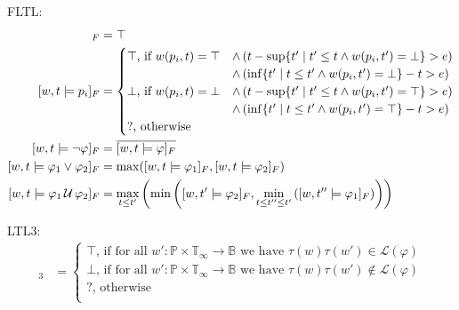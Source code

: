 \documentclass[envcountsame, runningheads]{llncs}
\newcommand{\B}{\mathbb{B}}
\def\until{\,\mathcal{U}\,}
\def\since{\,\mathcal{S}\,}
\newcommand{\?}{\text{?}}
\newcommand{\suchthat}{\;\ifnum\currentgrouptype=16 \middle\fi|\;}
\let\st\suchthat
\begin{document}
	FLTL:
	\begin{align*}
		[w,t \models \texttt{true}]_F &= \top \\
		[w,t \models p_i]_F &= \begin{cases}
			\top \text{, if } w(p_i, t) = \top
			&\land \left( t - \sup\{ t' \st t' \leq t \land w(p_i, t') = \bot \} > e \right)\\
			&\land \left( \inf\{ t' \st t \leq t' \land w(p_i, t') = \bot \} - t > e \right) \\
			\bot \text{, if } w(p_i, t) = \bot
			&\land \left( t - \sup\{ t' \st t' \leq t \land w(p_i, t') = \top \} > e \right)\\
			&\land \left( \inf\{ t' \st t \leq t' \land w(p_i, t') = \top \} - t > e \right) \\
			? \text{, otherwise}
		\end{cases} \\
		[w,t \models \lnot \varphi]_F &= \overline{[w,t \models \varphi]_F}\\
		[w,t \models \varphi_1 \lor \varphi_2]_F &= \max([w,t \models \varphi_1]_F, [w,t \models \varphi_2]_F)\\
		[w,t \models \varphi_1 \until \varphi_2]_F &= \max_{t \leq t'} \left( \min \left( [w,t' \models \varphi_2]_F, \min_{t \leq t'' \leq t'} \left( [w,t'' \models \varphi_1]_F \right) \right) \right)\\
	\end{align*}
	
	LTL3:
	\begin{align*}
		[w,t \models \varphi]_3 &= \begin{cases}
			\top \text{, if for all }  w' : \mathbb{P} \times \mathbb{T}_\infty \to \B  \text{ we have } \tau(w) \tau(w') \in \mathcal{L}(\varphi)\\
			\bot \text{, if for all }  w' : \mathbb{P} \times \mathbb{T}_\infty \to \B  \text{ we have } \tau(w) \tau(w') \notin \mathcal{L}(\varphi)\\
			? \text{, otherwise}\\
		\end{cases}
	\end{align*}
	
\end{document}
